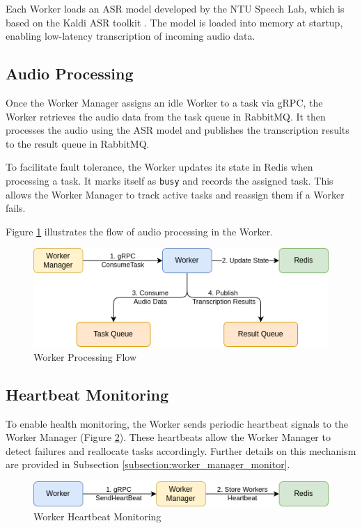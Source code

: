 Each Worker loads an ASR model developed by the NTU Speech Lab, which is based on the Kaldi ASR toolkit \cite{kaldi}. The model is loaded into memory at startup, enabling low-latency transcription of incoming audio data.

\subsection{Audio Processing}
Once the Worker Manager assigns an idle Worker to a task via gRPC, the Worker retrieves the audio data from the task queue in RabbitMQ. It then processes the audio using the ASR model and publishes the transcription results to the result queue in RabbitMQ.  

To facilitate fault tolerance, the Worker updates its state in Redis when processing a task. It marks itself as \texttt{busy} and records the assigned task. This allows the Worker Manager to track active tasks and reassign them if a Worker fails.

Figure \ref{fig:worker_processing} illustrates the flow of audio processing in the Worker.
\begin{figure}[ht]
  \centering
  \includegraphics[width=.8\textwidth]{figures/worker_processing.drawio.png}
  \caption{Worker Processing Flow}
  \label{fig:worker_processing}
\end{figure}

\subsection{Heartbeat Monitoring}
To enable health monitoring, the Worker sends periodic heartbeat signals to the Worker Manager (Figure \ref{fig:worker_heartbeat}). These heartbeats allow the Worker Manager to detect failures and reallocate tasks accordingly. Further details on this mechanism are provided in Subsection \ref{subsection:worker_manager_monitor}.

\begin{figure}[ht]
  \centering
  \includegraphics[width=.8\textwidth]{figures/worker_heartbeat.drawio.png}
  \caption{Worker Heartbeat Monitoring}
  \label{fig:worker_heartbeat}
\end{figure}

